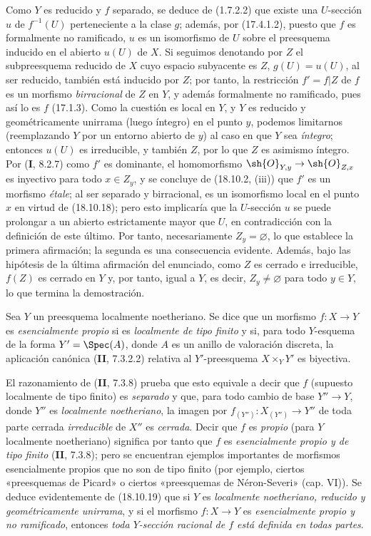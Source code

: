 Como $Y$ es reducido y $f$ separado, se deduce de (1.7.2.2) que existe una $U$-sección $u$ de $f^{-1}(U)$ perteneciente a la clase $g$; además, por (17.4.1.2), puesto que $f$ es formalmente no ramificado, $u$ es un isomorfismo de $U$ sobre el preesquema inducido en el abierto $u(U)$ de $X$. Si seguimos denotando por $Z$ el subpreesquema reducido de $X$ cuyo espacio subyacente es $Z$, $g(U)=u(U)$, al ser reducido, también está inducido por $Z$; por tanto, la restricción $f'=f|Z$ de $f$ es un morfismo \emph{birracional} de $Z$ en $Y$, y además formalmente no ramificado, pues así lo es $f$ (17.1.3). Como la cuestión es local en $Y$, y $Y$ es reducido y geométricamente unirrama (luego íntegro) en el punto $y$, podemos limitarnos (reemplazando $Y$ por un entorno abierto de $y$) al caso en que $Y$ sea \emph{íntegro}; entonces $u(U)$ es irreducible, y también $Z$, por lo que $Z$ es asimismo íntegro. Por (\textbf I, 8.2.7) como $f'$ es dominante, el homomorfismo $\sh{O}_{Y,y}\to\sh{O}_{Z,x}$ es inyectivo para todo $x\in Z_y$, y se concluye de (18.10.2, (iii)) que $f'$ es un morfismo \emph{étale}; al ser separado y birracional, es un isomorfismo local en el punto $x$ en virtud de (18.10.18); pero esto implicaría que la $U$-sección $u$ se puede prolongar a un abierto estrictamente mayor que $U$, en contradicción con la definición de este último. Por tanto, necesariamente $Z_y=\varnothing$, lo que establece la primera afirmación; la segunda es una consecuencia evidente. Además, bajo las hipótesis de la última afirmación del enunciado, como $Z$ es cerrado e irreducible, $f(Z)$ es cerrado en $Y$ y, por tanto, igual a $Y$, es decir, $Z_y\ne\varnothing$ para todo $y\in Y$, lo que termina la demostración.

\begin{remark}[18.10.20]
\label{IV.18.10.20}
Sea $Y$ un preesquema localmente noetheriano. Se dice que un morfismo $f:X\to Y$ es \emph{esencialmente propio} si es \emph{localmente de tipo finito} y si, para todo $Y$-esquema de la forma $Y'=\Spec(A)$, donde $A$ es un anillo de valoración discreta, la aplicación canónica (\textbf{II}, 7.3.2.2) relativa al $Y'$-preesquema $X\times_Y Y'$ es biyectiva.


El razonamiento de (\textbf{II}, 7.3.8) prueba que esto equivale a decir que $f$ (supuesto localmente de tipo finito) es \emph{separado} y que, para todo cambio de base $Y''\to Y$, donde $Y''$ es \emph{localmente noetheriano}, la imagen por $f_{(Y'')}:X_{(Y'')}\to Y''$ de toda parte cerrada \emph{irreducible} de $X''$ es \emph{cerrada}. Decir que $f$ es \emph{propio} (para $Y$ localmente noetheriano) significa por tanto que $f$ es \emph{esencialmente propio y de tipo finito} (\textbf{II}, 7.3.8); pero se encuentran ejemplos importantes de morfismos esencialmente propios que no son de tipo finito (por ejemplo, ciertos «preesquemas de Picard» o ciertos «preesquemas de Néron-Severi» (cap. VI)). Se deduce evidentemente de (18.10.19) que si $Y$ es \emph{localmente noetheriano, reducido y geométricamente unirrama}, y si el morfismo $f:X\to Y$ es \emph{esencialmente propio y no ramificado}, entonces \emph{toda $Y$-sección racional de $f$ está definida en todas partes}.
\end{remark}

